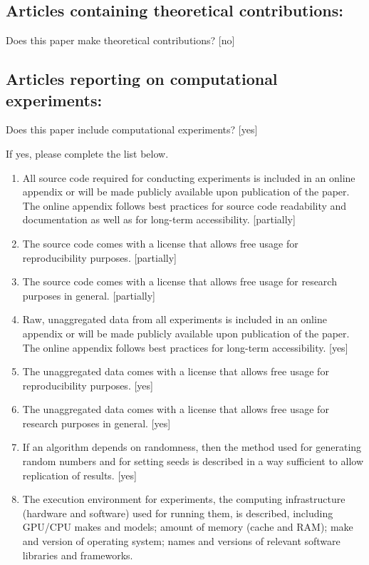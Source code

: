 \documentclass[]{amsart}
\theoremstyle{plain}
\begin{document}
\subsection*{Articles containing theoretical contributions:}
Does this paper make theoretical contributions? 
[no] 

\subsection*{Articles reporting on computational experiments:}
Does this paper include computational experiments? [yes]

If yes, please complete the list below.
\begin{enumerate}
    \item 
    All source code required for conducting experiments is included in an online appendix 
    or will be made publicly available upon publication of the paper.
    The online appendix follows best practices for source code readability and documentation as well as for long-term accessibility.
    [partially]
    \item The source code comes with a license that
    allows free usage for reproducibility purposes.
    [partially]
    \item The source code comes with a license that
    allows free usage for research purposes in general.
    [partially]
    \item 
    Raw, unaggregated data from all experiments is included in an online appendix 
    or will be made publicly available upon publication of the paper.
    The online appendix follows best practices for long-term accessibility.
    [yes]
    \item The unaggregated data comes with a license that
    allows free usage for reproducibility purposes.
    [yes]
    \item The unaggregated data comes with a license that
    allows free usage for research purposes in general.
    [yes]
    \item If an algorithm depends on randomness, then the method used for generating random numbers and for setting seeds is described in a way sufficient to allow replication of results. 
    [yes]
    \item The execution environment for experiments, the computing infrastructure (hardware and software) used for running them, is described, including GPU/CPU makes and models; amount of memory (cache and RAM); make and version of operating system; names and versions of relevant software libraries and frameworks. 

\end{enumerate}
\end{document}
